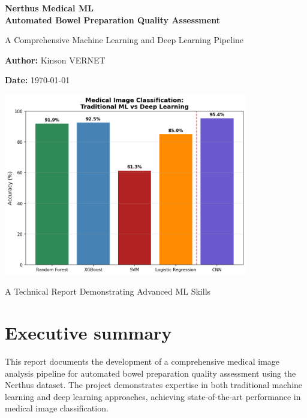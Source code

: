\documentclass[11pt]{article}
\begin{document}
\begin{titlepage}
    \centering
    \vspace*{2cm}
    
    {\Huge\bfseries Nerthus Medical ML \\ Automated Bowel Preparation Quality Assessment\par}
    \vspace{1cm}
    
    {\Large A Comprehensive Machine Learning and Deep Learning Pipeline\par}
    \vspace{2cm}
    
    {\large\textbf{Author:} Kinson VERNET\par}
    \vspace{0.5cm}
    
    {\large\textbf{Date:} \today\par}
    \vspace{2cm}
    
    \includegraphics[width=0.8\textwidth]{images/ml_vs_cnn_comparison}
    \vfill
    
    {\large A Technical Report Demonstrating Advanced ML Skills\par}
\end{titlepage}

\tableofcontents
\newpage

\section{Executive summary}

This report documents the development of a comprehensive medical image analysis pipeline for automated bowel preparation quality assessment using the Nerthus dataset. The project demonstrates expertise in both traditional machine learning and deep learning approaches, achieving state-of-the-art performance in medical image classification.
\end{document}
